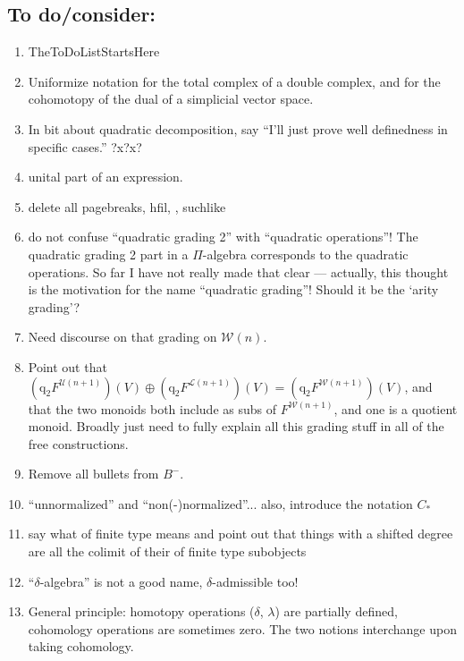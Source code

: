 \documentclass[11pt]{amsart} \renewcommand{\baselinestretch}{1.4}
\theoremstyle{plain}
\theoremstyle{definition}
\newcommand{\DASH}{\mathrm{-}}
\newcommand{\squishlist}{
  \setlength{\itemsep}{.5pt}
  \setlength{\parskip}{0pt}
  \setlength{\parsep}{0pt}}
\newcommand{\calU}{\mathcal{U}}
\newcommand{\calL}{\mathcal{L}}
\newcommand{\calw}{\mathcal{W}}
\newcommand{\calc}{\mathcal{C}}
\newcommand{\quadgrad}[1]{\mathrm{q}_{#1}}
\begin{document}
\begin{todolist}
\section{\textbf{To do/consider:}}
\begin{enumerate}\squishlist
\setlength{\parindent}{.25in}
\item TheToDoListStartsHere
\item Uniformize notation for the total complex of a double complex, and for the cohomotopy of the dual of a simplicial vector space.
\item In bit about quadratic decomposition, say ``I'll just prove well definedness in specific cases.'' ?x?x?
\item unital part of an expression.
\item delete all pagebreaks, hfil, \textbf{}, suchlike
\item do not confuse ``quadratic grading 2'' with ``quadratic operations''! The quadratic grading 2 part in a $\Pi$-algebra corresponds to the quadratic operations. So far I have not really made that clear --- actually, this thought is the motivation for the name ``quadratic grading''! Should it be the `arity grading'?
\item Need discourse on that grading on $\calw(n)$.
\item Point out that $(\quadgrad{2}F^{\calU(n+1)})(V)\oplus (\quadgrad{2}F^{\calL(n+1)})(V)=(\quadgrad{2}F^{\calw(n+1)})(V)$, and that the two monoids both include as subs of $F^{\calw(n+1)}$, and one is a quotient monoid. Broadly just need to fully explain all this grading stuff in all of the free constructions.
\item Remove all bullets from $B^{\DASH}.$
\item ``unnormalized'' and ``non(-)normalized''... also, introduce the notation $C_*$
\item say what  of finite type means and point out that things with a shifted degree are all the colimit of their  of finite type subobjects
\item ``$\delta$-algebra'' is not a good name, $\delta$-admissible too!
\item General principle: homotopy operations ($\delta$, {$\lambda$}) are partially defined, cohomology operations are sometimes zero. The two notions interchange upon taking cohomology.

\end{enumerate}
\end{todolist}
\end{document}
